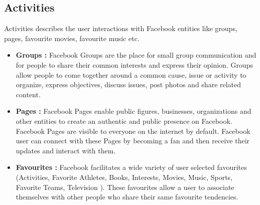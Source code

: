 \subsection{Activities}
Activities describes the user interactions with Facebook entities like groups, pages, favourite movies, favourite music etc.
\begin{itemize}
  \item \textbf{Groups :} Facebook Groups are the place for small group communication and for people to share their common interests 
  						and express their opinion. Groups allow people to come together around a common cause, issue or activity to
  						organize, express objectives, discuss issues, post photos and share related content.
  \item \textbf{Pages :}  Facebook Pages enable public figures, businesses, organizations and other entities to create an authentic 
  						and public presence on Facebook. Facebook Pages are visible to everyone on the internet 
  						by default. Facebook user can connect with these Pages by becoming a fan and then receive their updates and interact with them.
  \item \textbf{Favourites :} Facebook facilitates a wide variety of user selected favourites (Activities, Favorite Athletes, Books, 
  							Interests, Movies, Music, Sports, Favorite Teams, Television ). These favourites allow a user to associate themselves with other people who share their same favourite tendencies.
\end{itemize} 
 
      							
 

